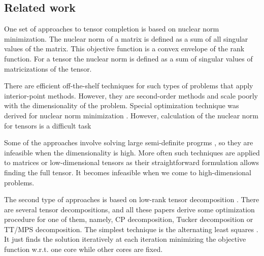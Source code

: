 \subsection{Related work}
\label{sec:related_works}
One set of approaches to tensor completion is based on nuclear norm minimization. The nuclear norm of a matrix is defined as a sum of all singular values of the matrix. This objective function is a convex envelope of the rank function. For a tensor the nuclear norm is defined as a sum of singular values of matricizations of the tensor.

There are efficient off-the-shelf techniques for such types of problems that apply interior-point methods. However, they are second-order methods and scale poorly with the dimensionality of the problem. Special optimization technique was derived for nuclear norm minimization
\citep{gandy2011tensor, liu2013tensor, recht2010guaranteed,yuan2016tensor}.
However, calculation of the nuclear norm for tensors is a difficult task \citep{hillar2013most}


Some of the approaches involve solving large semi-definite progrms \citep{barak2016noisy,potechin2017exact},
so they are infeasible when the dimensionality is high.
More often such techniques are applied to matrices or
low-dimensional tensors as their straightforward
formulation allows finding the full tensor.
It becomes infeasible when we come to high-dimensional problems.



The second type of approaches is based on low-rank tensor decomposition \citep{acar2011scalable, chen2013simultaneous, kressner2014low, steinlechner2016riemannian, yuan2017completion}. There are several tensor decompositions, and all these papers derive some optimization procedure for one of them, namely, CP decomposition, Tucker decomposition
\citep{kolda2009tensor} or TT/MPS decomposition. The simplest technique is the alternating least squares \citep{grasedyck2015alternating}.
It just finds the solution iteratively at each iteration minimizing the objective function w.r.t. one core while other cores are fixed.


